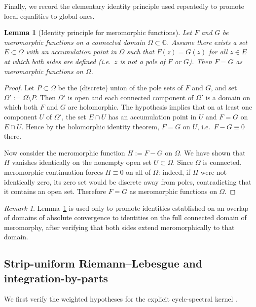 \documentclass[11pt]{amsart}
\newtheorem{lemma}[theorem]{Lemma}
\theoremstyle{definition}
\theoremstyle{remark}
\newtheorem{remark}[theorem]{Remark}
\newcommand{\C}{\mathbb{C}}
\begin{document}
Finally, we record the elementary identity principle used repeatedly to promote
local equalities to global ones.

\begin{lemma}[Identity principle for meromorphic functions]
\label{lem:identity}
Let $F$ and $G$ be meromorphic functions on a connected domain $\Omega\subset\C$.
Assume there exists a set $E\subset \Omega$ with an accumulation point in $\Omega$ such that
$F(z)=G(z)$ for all $z\in E$ at which both sides are defined (i.e.\ $z$ is not a pole of $F$ or $G$).
Then $F=G$ as meromorphic functions on $\Omega$.
\end{lemma}

\begin{proof}
Let $P\subset\Omega$ be the (discrete) union of the pole sets of $F$ and $G$, and set
$\Omega':=\Omega\setminus P$. Then $\Omega'$ is open and each connected component of $\Omega'$
is a domain on which both $F$ and $G$ are holomorphic. The hypothesis implies that on at least
one component $U$ of $\Omega'$, the set $E\cap U$ has an accumulation point in $U$ and
$F=G$ on $E\cap U$. Hence by the holomorphic identity theorem, $F=G$ on $U$, i.e.\ $F-G\equiv 0$
there.

Now consider the meromorphic function $H:=F-G$ on $\Omega$. We have shown that $H$ vanishes
identically on the nonempty open set $U\subset\Omega$. Since $\Omega$ is connected, meromorphic
continuation forces $H\equiv 0$ on all of $\Omega$: indeed, if $H$ were not identically zero,
its zero set would be discrete away from poles, contradicting that it contains an open set.
Therefore $F=G$ as meromorphic functions on $\Omega$.
\end{proof}

\begin{remark}
Lemma~\ref{lem:identity} is used only to promote identities established on an overlap of domains
of absolute convergence to identities on the full connected domain of meromorphy, after verifying
that both sides extend meromorphically to that domain.
\end{remark}






\subsection{Strip-uniform Riemann--Lebesgue and integration-by-parts}\label{app:strip-RL}

We first verify the weighted hypotheses \cite{PaperI} for the explicit cycle-spectral kernel
\cite{PaperI}.
\end{document}
